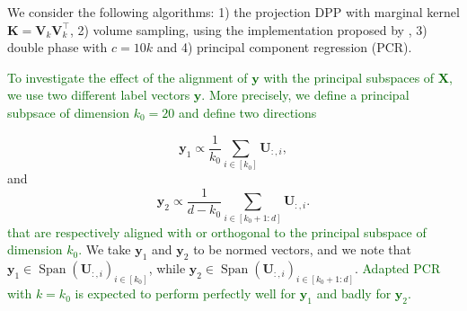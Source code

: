 \documentclass[twoside,11pt]{book}
\newcommand{\rev}[1]{\textcolor{darkgreen}{#1}}
\numberwithin{theorem}{chapter}
\numberwithin{definition}{chapter}
\numberwithin{proposition}{chapter}
\numberwithin{corollary}{chapter}
\numberwithin{example}{chapter}
\numberwithin{lemma}{chapter}
\numberwithin{assumption}{chapter}
\DeclareMathOperator{\Span}{\mathrm{Span}}
\DeclareMathOperator{\Tran}{\intercal}
\begin{document}
We consider the following algorithms: 1) the projection DPP with marginal kernel $\bm{K}=\bm{V}_{k}^{}\bm{V}_{k}^{\Tran}$, 2) volume sampling, using the implementation proposed by \cite{KuTa11}, 3) double phase with $c = 10k$ and 4) principal component regression (PCR).

\rev{To investigate the effect of the alignment of $\mathbf{y}$ with the principal subspaces of $\bm{X}$, we use two different label vectors $\mathbf{y}$. More precisely, we define a principal subpsace of dimension $k_0 = 20$ and define two directions}

\begin{equation}
\mathbf{y}_{1} \propto \frac{1}{k_0} \sum\limits_{i \in [k_0]} \bm{U}_{:,i},
\end{equation}
 and
\begin{equation}
\mathbf{y}_{2} \propto \frac{1}{d-k_0} \sum\limits_{i \in [k_0+1:d]} \bm{U}_{:,i}.
\end{equation}
\rev{that are respectively aligned with or orthogonal to the principal subspace of dimension $k_0$.}
We take $\mathbf{y}_{1}$ and $\mathbf{y}_{2}$ to be normed vectors, and we note that $\mathbf{y}_{1} \in \Span (\bm{U}_{:,i})_{i \in [k_0]}$, while $\mathbf{y}_{2} \in \Span (\bm{U}_{:,i})_{i \in [k_0+1:d]}$. \rev{Adapted PCR with $k=k_0$ is expected to perform perfectly well for $\mathbf{y}_{1}$ and badly for $\mathbf{y}_{2}$.}

\end{document}
